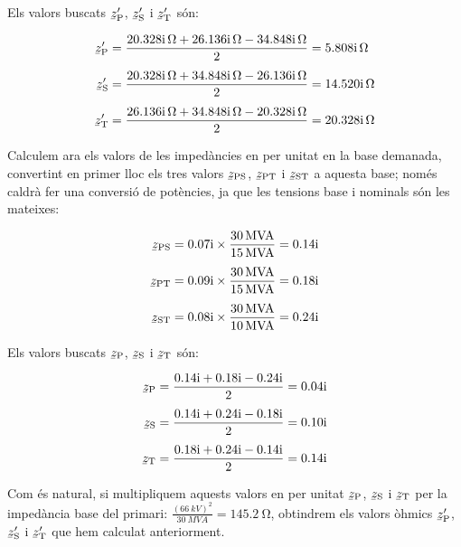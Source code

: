 \begin{exemple}
    Els valors buscats $\cmplx{z}\ped{P}'$, $\cmplx{z}\ped{S}'$ i $\cmplx{z}\ped{T}'$ són:

    \begin{align*}
        \cmplx{z}\ped{P}' &=  \frac{\complexqty{j 20,328}{\ohm} + \complexqty{j 26,136}{\ohm} - \complexqty{j 34,848}{\ohm}}{2} = \complexqty{j 5,808}{\ohm} \\[1ex]
        \cmplx{z}\ped{S}' &=  \frac{\complexqty{j 20,328}{\ohm} + \complexqty{j 34,848}{\ohm} - \complexqty{j 26,136}{\ohm}}{2} = \complexqty{j 14,520}{\ohm} \\[1ex]
        \cmplx{z}\ped{T}' &=  \frac{\complexqty{j 26,136}{\ohm} + \complexqty{j 34,848}{\ohm} - \complexqty{j 20,328}{\ohm}}{2} = \complexqty{j 20,328}{\ohm}
    \end{align*}

    Calculem ara els valors de les impedàncies en per unitat en la base demanada, convertint en primer lloc els tres valors $\cmplx{z}\ped{PS}$, $\cmplx{z}\ped{PT}$ i $\cmplx{z}\ped{ST}$ a aquesta base; només caldrà fer una conversió de potències, ja que les tensions base i nominals són les mateixes:

    \begin{align*}
        \cmplx{z}\ped{PS} &=  \complexnum{j 0,07} \times \frac{\qty{30}{MVA}}{\qty{15}{MVA}} = \complexnum{j 0,14}\\[1ex]
        \cmplx{z}\ped{PT} &=  \complexnum{j 0,09} \times \frac{\qty{30}{MVA}}{\qty{15}{MVA}} = \complexnum{j 0,18}\\[1ex]
        \cmplx{z}\ped{ST} &=  \complexnum{j 0,08} \times \frac{\qty{30}{MVA}}{\qty{10}{MVA}} = \complexnum{j 0,24}
    \end{align*}

    Els valors buscats $\cmplx{z}\ped{P}$, $\cmplx{z}\ped{S}$ i $\cmplx{z}\ped{T}$ són:

    \begin{align*}
        \cmplx{z}\ped{P} &=  \frac{\complexnum{j 0,14} + \complexnum{j 0,18} - \complexnum{j 0,24}}{2} = \complexnum{j 0,04} \\[1ex]
        \cmplx{z}\ped{S} &=  \frac{\complexnum{j 0,14} + \complexnum{j 0,24} - \complexnum{j 0,18}}{2} = \complexnum{j 0,10} \\[1ex]
        \cmplx{z}\ped{T} &=  \frac{\complexnum{j 0,18} + \complexnum{j 0,24} - \complexnum{j 0,14}}{2} = \complexnum{j 0,14}
    \end{align*}

     Com és natural, si multipliquem aquests valors en per unitat  $\cmplx{z}\ped{P}$, $\cmplx{z}\ped{S}$ i $\cmplx{z}\ped{T}$ per la impedància base del primari: $\frac{(\qty{66}{kV})^2}{\qty{30}{MVA}}=\qty{145,2}{\ohm}$, obtindrem els valors òhmics $\cmplx{z}\ped{P}'$,     $\cmplx{z}\ped{S}'$ i $\cmplx{z}\ped{T}'$ que hem calculat anteriorment.

\end{exemple}


